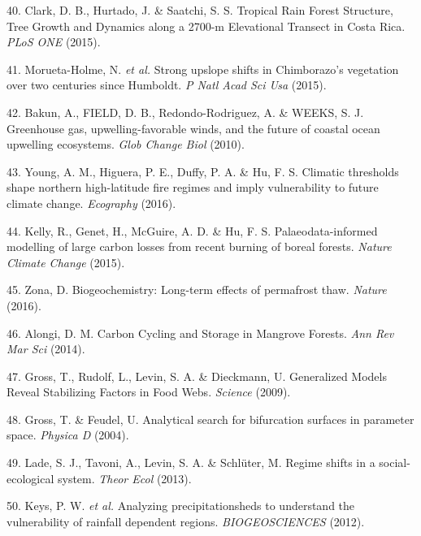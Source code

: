 \documentclass[9pt,]{article}
\begin{document}
\hypertarget{ref-Clark:2015bj}{}
40. Clark, D. B., Hurtado, J. \& Saatchi, S. S. Tropical Rain Forest
Structure, Tree Growth and Dynamics along a 2700-m Elevational Transect
in Costa Rica. \emph{PLoS ONE} (2015).

\hypertarget{ref-MoruetaHolme:2015fy}{}
41. Morueta-Holme, N. \emph{et al.} Strong upslope shifts in
Chimborazo's vegetation over two centuries since Humboldt. \emph{P Natl
Acad Sci Usa} (2015).

\hypertarget{ref-Bakun:2010p5340}{}
42. Bakun, A., FIELD, D. B., Redondo-Rodriguez, A. \& WEEKS, S. J.
Greenhouse gas, upwelling-favorable winds, and the future of coastal
ocean upwelling ecosystems. \emph{Glob Change Biol} (2010).

\hypertarget{ref-Young:2016kj}{}
43. Young, A. M., Higuera, P. E., Duffy, P. A. \& Hu, F. S. Climatic
thresholds shape northern high-latitude fire regimes and imply
vulnerability to future climate change. \emph{Ecography} (2016).

\hypertarget{ref-Kelly:2015iq}{}
44. Kelly, R., Genet, H., McGuire, A. D. \& Hu, F. S.
Palaeodata-informed modelling of large carbon losses from recent burning
of boreal forests. \emph{Nature Climate Change} (2015).

\hypertarget{ref-Zona:2016hq}{}
45. Zona, D. Biogeochemistry: Long-term effects of permafrost thaw.
\emph{Nature} (2016).

\hypertarget{ref-Alongi:2014kq}{}
46. Alongi, D. M. Carbon Cycling and Storage in Mangrove Forests.
\emph{Ann Rev Mar Sci} (2014).

\hypertarget{ref-Gross:2009jr}{}
47. Gross, T., Rudolf, L., Levin, S. A. \& Dieckmann, U. Generalized
Models Reveal Stabilizing Factors in Food Webs. \emph{Science} (2009).

\hypertarget{ref-Gross:2004uu}{}
48. Gross, T. \& Feudel, U. Analytical search for bifurcation surfaces
in parameter space. \emph{Physica D} (2004).

\hypertarget{ref-Lade:2013iwa}{}
49. Lade, S. J., Tavoni, A., Levin, S. A. \& Schlüter, M. Regime shifts
in a social-ecological system. \emph{Theor Ecol} (2013).

\hypertarget{ref-Keys:2012bo}{}
50. Keys, P. W. \emph{et al.} Analyzing precipitationsheds to understand
the vulnerability of rainfall dependent regions. \emph{BIOGEOSCIENCES}
(2012).
\end{document}

